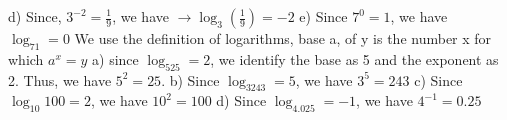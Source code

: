 \documentclass{report}
\begin{document}
d) Since, $3^{-2} = \frac{1}{9}$, we have $\rightarrow \log_3\left(\frac{1}{9}\right) = -2$
\bigbreak \noindent
e) Since $7^0 = 1$, we have $\log_71=0$
\bigbreak \noindent
{}
\bigbreak \noindent
\sol
We use the definition of logarithms, base a, of y is the number x for which $a^x=y$
\bigbreak \noindent
a) since $\log_525 = 2$, we identify the base as 5 and the exponent as 2. Thus, we have $5^2 = 25$.
\bigbreak \noindent
b) Since $\log_3243 = 5$, we have $3^5 = 243$
\bigbreak \noindent
c) Since $\log_{10}100=2$, we have $10^2 = 100$
\bigbreak \noindent
d) Since $\log_4.025 = -1$, we have $4^{-1} = 0.25$
\pagebreak
\end{document}
